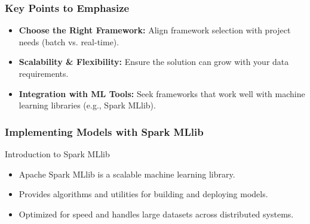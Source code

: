 \documentclass[aspectratio=169]{beamer}
\begin{document}
\begin{frame}[fragile]
    \frametitle{Key Points to Emphasize}
    \begin{itemize}
        \item \textbf{Choose the Right Framework:} Align framework selection with project needs (batch vs. real-time).
        \item \textbf{Scalability \& Flexibility:} Ensure the solution can grow with your data requirements.
        \item \textbf{Integration with ML Tools:} Seek frameworks that work well with machine learning libraries (e.g., Spark MLlib).
    \end{itemize}
\end{frame}

\begin{frame}[fragile]
    \frametitle{Implementing Models with Spark MLlib}
    \begin{block}{Introduction to Spark MLlib}
        \begin{itemize}
            \item Apache Spark MLlib is a scalable machine learning library.
            \item Provides algorithms and utilities for building and deploying models.
            \item Optimized for speed and handles large datasets across distributed systems.
        \end{itemize}
    \end{block}
\end{frame}
\end{document}
